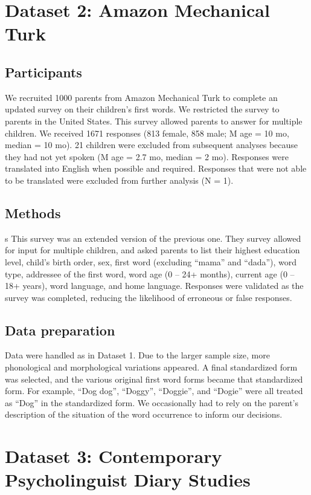 \documentclass[10pt,letterpaper]{article}
\begin{document}
\section{Dataset 2: Amazon Mechanical Turk}

\subsection{Participants}
We recruited 1000 parents from Amazon Mechanical Turk to complete an updated survey on their children’s first words. We restricted the survey to parents in the United States. This survey allowed parents to answer for multiple children. We received 1671 responses (813 female, 858 male; M age = 10 mo, median = 10 mo). 21 children were excluded from subsequent analyses because they had not yet spoken (M age = 2.7 mo, median = 2 mo). Responses were translated into English when possible and required. Responses that were not able to be translated were excluded from further analysis (N = 1).

\subsection{Methods}s
This survey was an extended version of the previous one. They survey allowed for input for multiple children, and asked parents to list their highest education level, child's birth order, sex,  first word (excluding “mama” and “dada”), word type, addressee of the first word, word age (0 – 24+ months), current age (0 – 18+ years), word language, and home language.  Responses were validated as the survey was completed, reducing the likelihood of erroneous or false responses. 

\subsection{Data preparation}
Data were handled as in Dataset 1. Due to the larger sample size, more phonological and morphological variations appeared. A final standardized form was selected, and the various original first word forms became that standardized form. For example,  “Dog dog”, “Doggy”, “Doggie”, and “Dogie” were all treated as “Dog” in the standardized form. We occasionally had to rely on the parent’s description of the situation of the word occurrence to inform our decisions.

\section{Dataset 3: Contemporary Psycholinguist Diary Studies}
\end{document}
